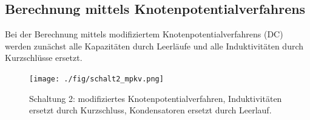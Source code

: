 \subsection{Berechnung mittels Knotenpotentialverfahrens}

Bei der Berechnung mittels modifiziertem Knotenpotentialverfahrens (DC) werden zunächst alle
Kapazitäten durch Leerläufe und alle Induktivitäten durch Kurzschlüsse ersetzt.



\begin{figure}[h!]
 \centering
 \texttt{[image: ./fig/schalt2\_mpkv.png]}
 \caption{Schaltung 2: modifiziertes Knotenpotentialverfahren, Induktivitäten ersetzt durch Kurzschluss, Kondensatoren ersetzt durch Leerlauf.}
 \label{fig:schalt2_mpkv}
\end{figure}
